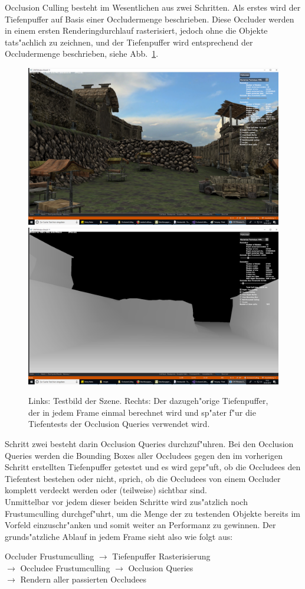 \documentclass[journal]{vgtc}
\begin{document}
Occlusion Culling besteht im Wesentlichen aus zwei Schritten. Als erstes wird der Tiefenpuffer auf Basis einer Occludermenge beschrieben. Diese Occluder werden in einem ersten Renderingdurchlauf rasterisiert, jedoch ohne die Objekte tats"achlich zu zeichnen, und der Tiefenpuffer wird entsprechend der Occludermenge beschrieben, siehe Abb.\ \ref{fig:db}.
\begin{figure}%
\includegraphics[width=0.5\columnwidth]{images/Base1.png}%
\includegraphics[width=0.5\columnwidth]{images/Base1DB.png}%
\caption{Links: Testbild der Szene. Rechts: Der dazugeh"orige Tiefenpuffer, der in jedem Frame einmal berechnet wird und sp"ater f"ur die Tiefentests der Occlusion Queries verwendet wird.}%
\label{fig:db}%
\end{figure}
Schritt zwei besteht darin Occlusion Queries durchzuf"uhren. Bei den Occlusion Queries werden die Bounding Boxes aller Occludees gegen den im vorherigen Schritt erstellten Tiefenpuffer getestet und es wird gepr"uft, ob die Occludees den Tiefentest bestehen oder nicht, sprich, ob die Occludees von einem Occluder komplett verdeckt werden oder (teilweise) sichtbar sind.\\
Unmittelbar vor jedem dieser beiden Schritte wird zus"atzlich noch Frustumculling durchgef"uhrt, um die Menge der zu testenden Objekte bereits im Vorfeld einzuschr"anken und somit weiter an Performanz zu gewinnen. Der grunds"atzliche Ablauf in jedem Frame sieht also wie folgt aus:\\

\begin{minipage}{0.1\textwidth}\end{minipage}\begin{minipage}{0.4\textwidth}Occluder Frustumculling $\rightarrow$ Tiefenpuffer Rasterisierung\\$\rightarrow$ Occludee Frustumculling $\rightarrow$ Occlusion Queries\\$\rightarrow$ Rendern aller passierten Occludees\end{minipage}
\end{document}
